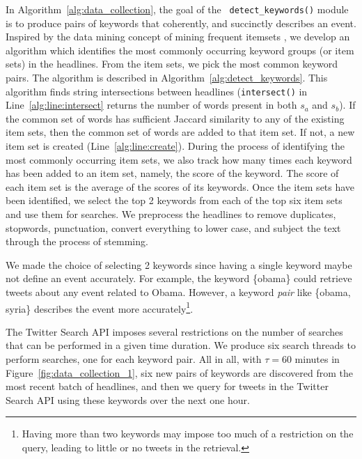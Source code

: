 In Algorithm~\ref{alg:data_collection}, the goal of the {\tt
  detect\_keywords()} module is to produce pairs of keywords that
coherently, and succinctly describes an event. Inspired by the data
mining concept of mining frequent itemsets \cite{Tan_Steinbach_Kumar},
we develop an algorithm which identifies the most commonly occurring
keyword groups (or item sets) in the headlines. From the item sets, we
pick the most common keyword pairs. The algorithm is described in
Algorithm~\ref{alg:detect_keywords}. This algorithm finds string
intersections between headlines ({\tt intersect()} in
Line~\ref{alg:line:intersect} returns the number of words present in
both $s_a$ and $s_b$). If the common set of words has sufficient
Jaccard similarity to any of the existing item sets, then the common
set of words are added to that item set. If not, a new item set is
created (Line~\ref{alg:line:create}). During the process of
identifying the most commonly occurring item sets, we also track how
many times each keyword has been added to an item set, namely, the
score of the keyword. The score of each item set is the average of the
scores of its
keywords. %
Once the item sets have been identified, we select the top 2 keywords
from each of the top six item sets and use them for searches. We
preprocess the headlines to remove duplicates, stopwords, punctuation,
convert everything to lower case, and subject the text through the
process of stemming.

We made the choice of selecting 2 keywords since having a single
keyword maybe not define an event accurately. For example, the keyword
\{obama\} could retrieve tweets about any event related to Obama.
However, a keyword \emph{pair} like \{obama, syria\} describes the
event more accurately\footnote{Having more than two keywords may
  impose too much of a restriction on the query, leading to little or
  no tweets in the retrieval.}.

The Twitter Search API imposes several restrictions on the number of
searches that can be performed in a given time duration.
We produce six search threads to perform searches, one for each
keyword pair. All in all, with $\tau = 60$ minutes in
Figure~\ref{fig:data_collection_1}, six new pairs of keywords are
discovered from the most recent batch of headlines, and then we query
for tweets in the Twitter Search API using these keywords over the
next one hour.

